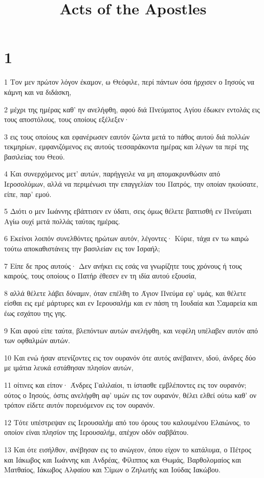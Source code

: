 

\title{Acts of the Apostles}


\chapter{1}

\par 1 Τον μεν πρώτον λόγον έκαμον, ω Θεόφιλε, περί πάντων όσα ήρχισεν ο Ιησούς να κάμνη και να διδάσκη,
\par 2 μέχρι της ημέρας καθ' ην ανελήφθη, αφού διά Πνεύματος Αγίου έδωκεν εντολάς εις τους αποστόλους, τους οποίους εξέλεξεν·
\par 3 εις τους οποίους και εφανέρωσεν εαυτόν ζώντα μετά το πάθος αυτού διά πολλών τεκμηρίων, εμφανιζόμενος εις αυτούς τεσσαράκοντα ημέρας και λέγων τα περί της βασιλείας του Θεού.
\par 4 Και συνερχόμενος μετ' αυτών, παρήγγειλε να μη απομακρυνθώσιν από Ιεροσολύμων, αλλά να περιμένωσι την επαγγελίαν του Πατρός, την οποίαν ηκούσατε, είπε, παρ' εμού.
\par 5 Διότι ο μεν Ιωάννης εβάπτισεν εν ύδατι, σεις όμως θέλετε βαπτισθή εν Πνεύματι Αγίω ουχί μετά πολλάς ταύτας ημέρας.
\par 6 Εκείνοι λοιπόν συνελθόντες ηρώτων αυτόν, λέγοντες· Κύριε, τάχα εν τω καιρώ τούτω αποκαθιστάνεις την βασιλείαν εις τον Ισραήλ;
\par 7 Είπε δε προς αυτούς· Δεν ανήκει εις εσάς να γνωρίζητε τους χρόνους ή τους καιρούς, τους οποίους ο Πατήρ έθεσεν εν τη ιδία αυτού εξουσία,
\par 8 αλλά θέλετε λάβει δύναμιν, όταν επέλθη το Άγιον Πνεύμα εφ' υμάς, και θέλετε είσθαι εις εμέ μάρτυρες και εν Ιερουσαλήμ και εν πάση τη Ιουδαία και Σαμαρεία και έως εσχάτου της γης.
\par 9 Και αφού είπε ταύτα, βλεπόντων αυτών ανελήφθη, και νεφέλη υπέλαβεν αυτόν από των οφθαλμών αυτών.
\par 10 Και ενώ ήσαν ατενίζοντες εις τον ουρανόν ότε αυτός ανέβαινεν, ιδού, άνδρες δύο με ιμάτια λευκά εστάθησαν πλησίον αυτών,
\par 11 οίτινες και είπον· Άνδρες Γαλιλαίοι, τι ίστασθε εμβλέποντες εις τον ουρανόν; ούτος ο Ιησούς, όστις ανελήφθη αφ' υμών εις τον ουρανόν, θέλει ελθεί ούτω καθ' ον τρόπον είδετε αυτόν πορευόμενον εις τον ουρανόν.
\par 12 Τότε υπέστρεψαν εις Ιερουσαλήμ από του όρους του καλουμένου Ελαιώνος, το οποίον είναι πλησίον της Ιερουσαλήμ, απέχον οδόν σαββάτου.
\par 13 Και ότε εισήλθον, ανέβησαν εις το ανώγεον, όπου είχον το κατάλυμα, ο Πέτρος και Ιάκωβος και Ιωάννης και Ανδρέας, Φίλιππος και Θωμάς, Βαρθολομαίος και Ματθαίος, Ιάκωβος Αλφαίου και Σίμων ο Ζηλωτής και Ιούδας Ιακώβου.
